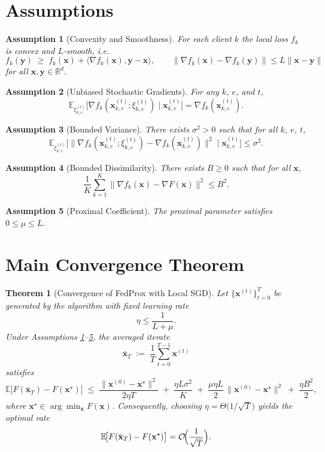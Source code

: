 \documentclass{article}
\newtheorem{theorem}{Theorem}
\newtheorem{assumption}{Assumption}
\newcommand{\E}{\mathbb{E}}
\newcommand{\R}{\mathbb{R}}
\begin{document}
\newpage
\section*{Assumptions}
\begin{assumption}[Convexity and Smoothness]\label{ass:conv-smooth}
For each client $k$ the local loss $f_k$ is convex and $L$‑smooth, i.e.
\[
f_k(\mathbf{y})\;\ge\;f_k(\mathbf{x})+\langle\nabla f_k(\mathbf{x}),\mathbf{y}-\mathbf{x}\rangle,
\qquad
\|\nabla f_k(\mathbf{x})-\nabla f_k(\mathbf{y})\|\le L\|\mathbf{x}-\mathbf{y}\|
\]
for all $\mathbf{x},\mathbf{y}\in\R^{d}$.
\end{assumption}

\begin{assumption}[Unbiased Stochastic Gradients]\label{ass:unbiased}
For any $k$, $e$, and $t$,
\[
\E_{\xi^{(t)}_{k,e}}\!\bigl[\nabla f_k(\mathbf{x}^{(t)}_{k,e};\xi^{(t)}_{k,e})\mid\mathbf{x}^{(t)}_{k,e}\bigr]
=
\nabla f_k(\mathbf{x}^{(t)}_{k,e}).
\]
\end{assumption}

\begin{assumption}[Bounded Variance]\label{ass:variance}
There exists $\sigma^{2}>0$ such that for all $k$, $e$, $t$,
\[
\E_{\xi^{(t)}_{k,e}}
\!\bigl[\|\nabla f_k(\mathbf{x}^{(t)}_{k,e};\xi^{(t)}_{k,e})-\nabla f_k(\mathbf{x}^{(t)}_{k,e})\|^{2}
\mid\mathbf{x}^{(t)}_{k,e}\bigr]
\le \sigma^{2}.
\]
\end{assumption}

\begin{assumption}[Bounded Dissimilarity]\label{ass:dissim}
There exists $B\ge0$ such that for all $\mathbf{x}$,
\[
\frac1K\sum_{k=1}^{K}\|\nabla f_k(\mathbf{x})-\nabla F(\mathbf{x})\|^{2}\le B^{2}.
\]
\end{assumption}

\begin{assumption}[Proximal Coefficient]\label{ass:mu}
The proximal parameter satisfies $0\le\mu\le L$.
\end{assumption}

\section*{Main Convergence Theorem}
\begin{theorem}[Convergence of FedProx with Local SGD]\label{thm:conv}
Let $\{\mathbf{x}^{(t)}\}_{t=0}^{T}$ be generated by the algorithm with fixed learning rate
\[
\eta \le \frac{1}{L+\mu}.
\]
Under Assumptions \ref{ass:conv-smooth}–\ref{ass:mu}, the averaged iterate
\[
\bar{\mathbf{x}}_{T}\;:=\;\frac1T\sum_{t=0}^{T-1}\mathbf{x}^{(t)}
\]
satisfies
\[
\E\!\bigl[F(\bar{\mathbf{x}}_{T})-F(\mathbf{x}^{\star})\bigr]
\;\le\;
\frac{\|\mathbf{x}^{(0)}-\mathbf{x}^{\star}\|^{2}}{2\eta T}
\;+\;
\frac{\eta L\sigma^{2}}{K}
\;+\;
\frac{\mu\eta L}{2}\,\|\mathbf{x}^{(0)}-\mathbf{x}^{\star}\|^{2}
\;+\;
\frac{\eta B^{2}}{2},
\tag{4}
\]
where $\mathbf{x}^{\star}\in\arg\min_{\mathbf{x}}F(\mathbf{x})$.
Consequently, choosing $\eta =\Theta\!\bigl(1/\sqrt{T}\bigr)$ yields the optimal rate
\[
\E\!\bigl[F(\bar{\mathbf{x}}_{T})-F(\mathbf{x}^{\star})\bigr]=\mathcal{O}\!\Bigl(\frac{1}{\sqrt{T}}\Bigr).
\]
\end{theorem}
\end{document}
